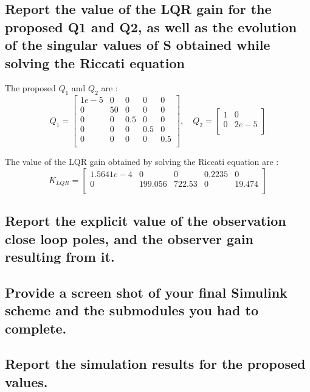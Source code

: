 \subsection{ Report the value of the LQR gain for the proposed Q1 and Q2, as well as the evolution of the singular values of S obtained while solving the Riccati equation}
The proposed $Q_1$ and $Q_2$ are :
\begin{equation}
    Q_1 = 
    \left[ {\begin{array}{ccccc}
        1e-5 &0  &0   &0   &0     \\
        0    &50 &0   &0   &0     \\
        0    &0  &0.5 &0   &0     \\
        0    &0  &0   &0.5 &0     \\
        0    &0  &0   &0   &0.5   \\
    \end{array} } \right]    
    ,\quad
    Q_2 =
    \left[ {\begin{array}{cc}
        1 &0\\
        0 &2e-5\\
    \end{array} } \right]
\end{equation}

The value of the LQR gain obtained by solving the Riccati equation are :
\begin{equation}
    K_{LQR} = 
    \left[ {\begin{array}{ccccc}
         1.5641e-4 &0       &0      &0.2235 &0      \\
         0         &199.056 &722.53 &0      &19.474 \\
    \end{array}}\right]
\end{equation}


\subsection{Report the explicit value of the observation close loop poles, and the observer gain resulting
from it.}


\subsection{Provide a screen shot of your final Simulink scheme and the submodules you had to complete.}


\subsection{Report the simulation results for the proposed values.}


